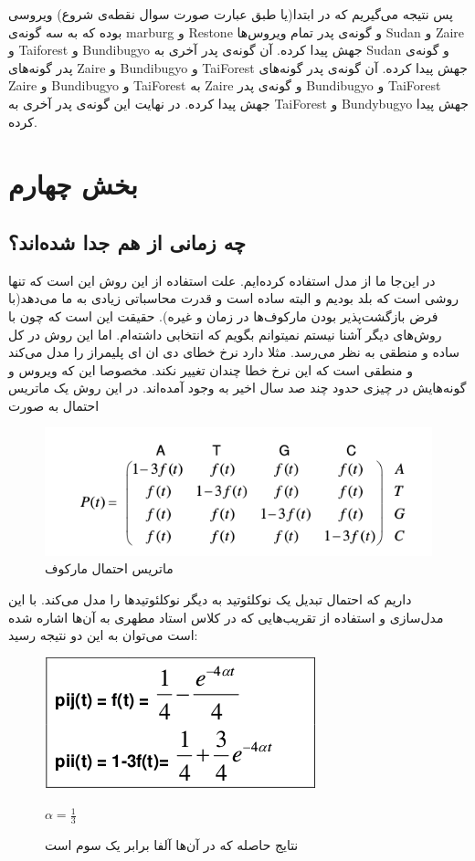 \documentclass[11pt]{article}
\begin{document}
پس  نتیجه می‌گیریم که در ابتدا(یا طبق عبارت صورت سوال نقطه‌ی شروع) ویروسی بوده که به سه گونه‌ی  marburg و Restone و گونه‌ی پدر تمام ویروس‌ها Sudan و Zaire و Taiforest و Bundibugyo جهش پیدا کرده. آن گونه‌ی پدر آخری به Sudan و گونه‌ی پدر گونه‌‌های Zaire و ‌Bundibugyo و TaiForest جهش پیدا کرده. آن گونه‌ی پدر گونه‌‌های  Zaire و ‌Bundibugyo و TaiForest به Zaire و گونه‌ی ‌پدر Bundibugyo و TaiForest جهش پیدا کرده. در نهایت این گونه‌ی پدر آخری به TaiForest و ‌Bundybugyo جهش پیدا کرده.

\section{بخش چهارم}
\subsection{چه زمانی از هم جدا شده‌اند؟}
در این‌جا ما از مدل
  استفاده کرده‌ایم. علت استفاده از این روش  این است که تنها روشی است که بلد بودیم و البته ساده ‌است و قدرت محاسباتی زیادی به ما می‌دهد(با فرض بازگشت‌پذیر بودن مارکوف‌ها در زمان و غیره). حقیقت این است که چون با روش‌های دیگر آشنا نیستم نمیتوانم بگویم که انتخابی داشته‌ام. اما این روش در کل ساده و منطقی به نظر می‌رسد. مثلا دارد نرخ خطای دی ان ای پلیمراز را مدل می‌کند و منطقی است که این نرخ خطا چندان تغییر نکند. مخصوصا این که ویروس و گونه‌‌هایش در چیزی حدود چند صد سال اخیر به وجود آمده‌اند. در این روش یک ماتریس احتمال به صورت
\begin{figure}[H]
  \centering
  \includegraphics[width=\linewidth]{prob_markov.png}
  \caption{ماتریس احتمال مارکوف}
\end{figure}
داریم که احتمال تبدیل یک نوکلئوتید به دیگر نوکلئوتید‌ها را مدل می‌کند. با این مدل‌سازی و استفاده از تقریب‌هایی که در کلاس استاد مطهری به آن‌ها اشاره شده است می‌توان به این دو نتیجه رسید:

\begin{figure}[H]
  \centering
  \includegraphics[width=\linewidth]{result.png}
  \caption{ 
نتایج حاصله که در آن‌ها آلفا برابر یک سوم است
  }
  $\alpha = \frac{1}{3}$
\end{figure}
\end{document}

